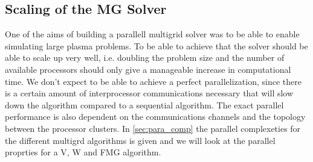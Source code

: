 \subsection{Scaling of the MG Solver}
	One of the aims of building a parallell multigrid solver was to be able
	to enable simulating large plasma problems. To be able to achieve that the solver
	should be able to scale up very well, i.e. doubling the problem size and the number
	of available processors should only give a manageable increase in computational time.
	We don't expect to be able to achieve a perfect parallelization, since there is
	a certain amount of interprocessor communications necessary that will slow down
	the algorithm compared to a sequential algorithm. The exact parallel performance
	is also dependent on the communications channels and the topology between the processor clusters.
	In \cref{sec:para_comp} the parallel
	complexeties for the different multigrd algorithms is given and we will look at
	the parallel proprties for a V, W and FMG algorithm.


